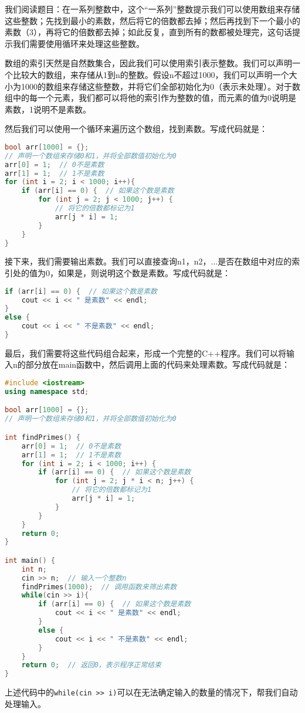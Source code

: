 \begin{answer}
  我们阅读题目：在一系列整数中，这个“一系列”整数提示我们可以使用数组来存储这些整数；先找到最小的素数，然后将它的倍数都去掉；然后再找到下一个最小的素数（3），再将它的倍数都去掉；如此反复，直到所有的数都被处理完，这句话提示我们需要使用循环来处理这些整数。

  数组的索引天然是自然数集合，因此我们可以使用索引表示整数。我们可以声明一个比较大的数组，来存储从1到n的整数。假设n不超过1000，我们可以声明一个大小为1000的数组来存储这些整数，并将它们全部初始化为0（表示未处理）。对于数组中的每一个元素，我们都可以将他的索引作为整数的值，而元素的值为0说明是素数，1说明不是素数。

  然后我们可以使用一个循环来遍历这个数组，找到素数。写成代码就是：
\begin{lstlisting}[language=C++]
bool arr[1000] = {};
// 声明一个数组来存储0和1，并将全部数值初始化为0
arr[0] = 1;  // 0不是素数
arr[1] = 1;  // 1不是素数
for (int i = 2; i < 1000; i++){
    if (arr[i] == 0) {  // 如果这个数是素数
        for (int j = 2; j < 1000; j++) {
            // 将它的倍数都标记为1
            arr[j * i] = 1;
        }
    }
}
\end{lstlisting}

  接下来，我们需要输出素数。我们可以直接查询n1，n2，...是否在数组中对应的索引处的值为0，如果是，则说明这个数是素数。写成代码就是：
\begin{lstlisting}[language=C++]
if (arr[i] == 0) {  // 如果这个数是素数
    cout << i << " 是素数" << endl;
}
else {
    cout << i << " 不是素数" << endl;
}
\end{lstlisting}
  最后，我们需要将这些代码组合起来，形成一个完整的C++程序。我们可以将输入n的部分放在main函数中，然后调用上面的代码来处理素数。写成代码就是：
\begin{lstlisting}[language=C++]
#include <iostream>
using namespace std;

bool arr[1000] = {};
// 声明一个数组来存储0和1，并将全部数值初始化为0

int findPrimes() {
    arr[0] = 1;  // 0不是素数
    arr[1] = 1;  // 1不是素数
    for (int i = 2; i < 1000; i++) {
        if (arr[i] == 0) {  // 如果这个数是素数
            for (int j = 2; j * i < n; j++) {
                // 将它的倍数都标记为1
                arr[j * i] = 1;
            }
        }
    }
    return 0;
}

int main() {
    int n;
    cin >> n;  // 输入一个整数n
    findPrimes(1000);  // 调用函数来筛出素数
    while(cin >> i){
        if (arr[i] == 0) {  // 如果这个数是素数
            cout << i << " 是素数" << endl;
        }
        else {
            cout << i << " 不是素数" << endl;
        }
    }
    return 0;  // 返回0，表示程序正常结束
}
\end{lstlisting}
  上述代码中的\texttt{while(cin >> i)}可以在无法确定输入的数量的情况下，帮我们自动处理输入。
\end{answer}

